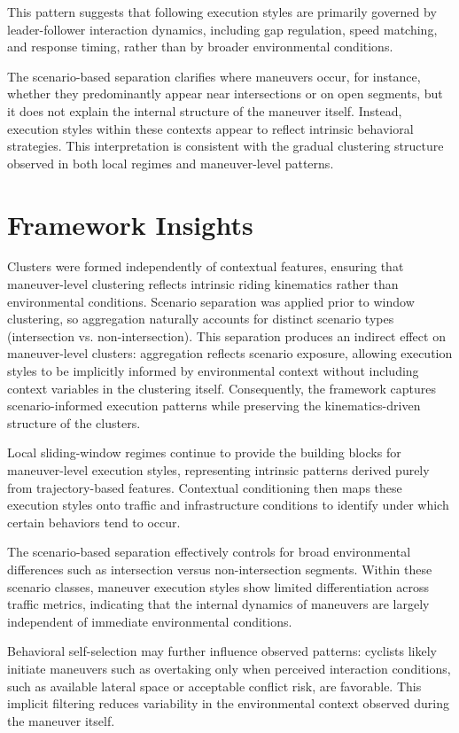 This pattern suggests that following execution styles are primarily governed by leader-follower interaction dynamics, including gap regulation, speed matching, and response timing, rather than by broader environmental conditions.

The scenario-based separation clarifies where maneuvers occur, for instance, whether they predominantly appear near intersections or on open segments, but it does not explain the internal structure of the maneuver itself. Instead, execution styles within these contexts appear to reflect intrinsic behavioral strategies. This interpretation is consistent with the gradual clustering structure observed in both local regimes and maneuver-level patterns.


\section{Framework Insights}

Clusters were formed independently of contextual features, ensuring that maneuver-level clustering reflects intrinsic riding kinematics rather than environmental conditions. Scenario separation was applied prior to window clustering, so aggregation naturally accounts for distinct scenario types (intersection vs. non-intersection). This separation produces an indirect effect on maneuver-level clusters: aggregation reflects scenario exposure, allowing execution styles to be implicitly informed by environmental context without including context variables in the clustering itself. Consequently, the framework captures scenario-informed execution patterns while preserving the kinematics-driven structure of the clusters.

Local sliding-window regimes continue to provide the building blocks for maneuver-level execution styles, representing intrinsic patterns derived purely from trajectory-based features. Contextual conditioning then maps these execution styles onto traffic and infrastructure conditions to identify under which certain behaviors tend to occur.

The scenario-based separation effectively controls for broad environmental differences such as intersection versus non-intersection segments. Within these scenario classes, maneuver execution styles show limited differentiation across traffic metrics, indicating that the internal dynamics of maneuvers are largely independent of immediate environmental conditions.

Behavioral self-selection may further influence observed patterns: cyclists likely initiate maneuvers such as overtaking only when perceived interaction conditions, such as available lateral space or acceptable conflict risk, are favorable. This implicit filtering reduces variability in the environmental context observed during the maneuver itself.

